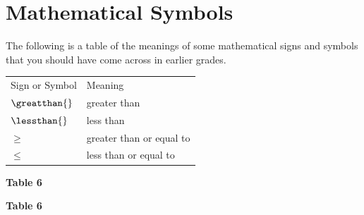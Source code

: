     \section{Mathematical Symbols}
            \nopagebreak
      \label{m38346*id180211}The following is a table of the meanings of some mathematical signs and symbols that you should have come across in earlier grades.\par 
          \begin{table}
        \begin{center}
      \label{m38346*uid75}
    \noindent
      \tablelasttail{}
      \begin{xtabular}[t]{|l|l|}\hline
        Sign or Symbol &
        Meaning%
     \tabularnewline{}
                $\greatthan{}$
               &
        greater than%
     \tabularnewline{}
                $\lessthan{}$
               &
        less than%
     \tabularnewline{}
                $\ge $
               &
        greater than or equal to%
     \tabularnewline{}
                $\le $
               &
        less than or equal to%
     \tabularnewline{}
    \end{xtabular}
      \end{center}
    \begin{center}{\small\bfseries Table 6}\end{center}
    \begin{caption}{\small\bfseries Table 6}\end{caption}
\end{table}
